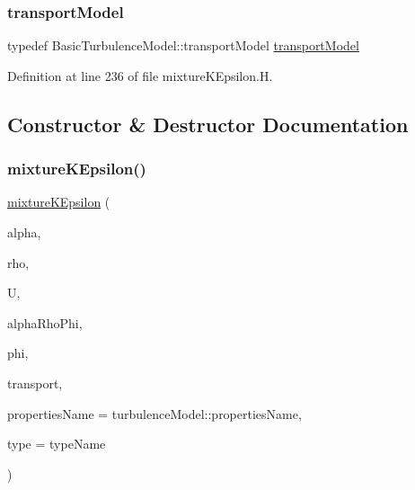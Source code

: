 \subsubsection{\texorpdfstring{transport\+Model}{transportModel}}
{\footnotesize\ttfamily typedef Basic\+Turbulence\+Model\+::transport\+Model \hyperlink{classFoam_1_1RASModels_1_1mixtureKEpsilon_ac0a5dc3c45a2d1c61a649bc435a1a48a}{transport\+Model}}



Definition at line 236 of file mixture\+K\+Epsilon.\+H.



\subsection{Constructor \& Destructor Documentation}
\mbox{\label{classFoam_1_1RASModels_1_1mixtureKEpsilon_a8a7ec1494a8e894fa723875426b4c21b}} 
\subsubsection{\texorpdfstring{mixture\+K\+Epsilon()}{mixtureKEpsilon()}}
{\footnotesize\ttfamily \hyperlink{classFoam_1_1RASModels_1_1mixtureKEpsilon}{mixture\+K\+Epsilon} (\begin{DoxyParamCaption}\item[{const \hyperlink{classFoam_1_1RASModels_1_1mixtureKEpsilon_a06a66094f33d6817d19225445c5ea874}{alpha\+Field} \&}]{alpha,  }\item[{const \hyperlink{classFoam_1_1RASModels_1_1mixtureKEpsilon_a1dda906cfc9022335f0782a632302cd8}{rho\+Field} \&}]{rho,  }\item[{const vol\+Vector\+Field \&}]{U,  }\item[{const surface\+Scalar\+Field \&}]{alpha\+Rho\+Phi,  }\item[{const surface\+Scalar\+Field \&}]{phi,  }\item[{const \hyperlink{classFoam_1_1RASModels_1_1mixtureKEpsilon_ac0a5dc3c45a2d1c61a649bc435a1a48a}{transport\+Model} \&}]{transport,  }\item[{const word \&}]{properties\+Name = {\ttfamily turbulenceModel\+:\+:propertiesName},  }\item[{const word \&}]{type = {\ttfamily typeName} }\end{DoxyParamCaption})}



